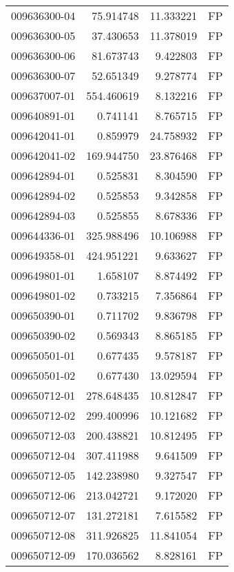 \begin{tabular}{lrrl}
009636300-04 &   75.914748 &      11.333221 &   FP \\
009636300-05 &   37.430653 &      11.378019 &   FP \\
009636300-06 &   81.673743 &       9.422803 &   FP \\
009636300-07 &   52.651349 &       9.278774 &   FP \\
009637007-01 &  554.460619 &       8.132216 &   FP \\
009640891-01 &    0.741141 &       8.765715 &   FP \\
009642041-01 &    0.859979 &      24.758932 &   FP \\
009642041-02 &  169.944750 &      23.876468 &   FP \\
009642894-01 &    0.525831 &       8.304590 &   FP \\
009642894-02 &    0.525853 &       9.342858 &   FP \\
009642894-03 &    0.525855 &       8.678336 &   FP \\
009644336-01 &  325.988496 &      10.106988 &   FP \\
009649358-01 &  424.951221 &       9.633627 &   FP \\
009649801-01 &    1.658107 &       8.874492 &   FP \\
009649801-02 &    0.733215 &       7.356864 &   FP \\
009650390-01 &    0.711702 &       9.836798 &   FP \\
009650390-02 &    0.569343 &       8.865185 &   FP \\
009650501-01 &    0.677435 &       9.578187 &   FP \\
009650501-02 &    0.677430 &      13.029594 &   FP \\
009650712-01 &  278.648435 &      10.812847 &   FP \\
009650712-02 &  299.400996 &      10.121682 &   FP \\
009650712-03 &  200.438821 &      10.812495 &   FP \\
009650712-04 &  307.411988 &       9.641509 &   FP \\
009650712-05 &  142.238980 &       9.327547 &   FP \\
009650712-06 &  213.042721 &       9.172020 &   FP \\
009650712-07 &  131.272181 &       7.615582 &   FP \\
009650712-08 &  311.926825 &      11.841054 &   FP \\
009650712-09 &  170.036562 &       8.828161 &   FP \\

\end{tabular}
